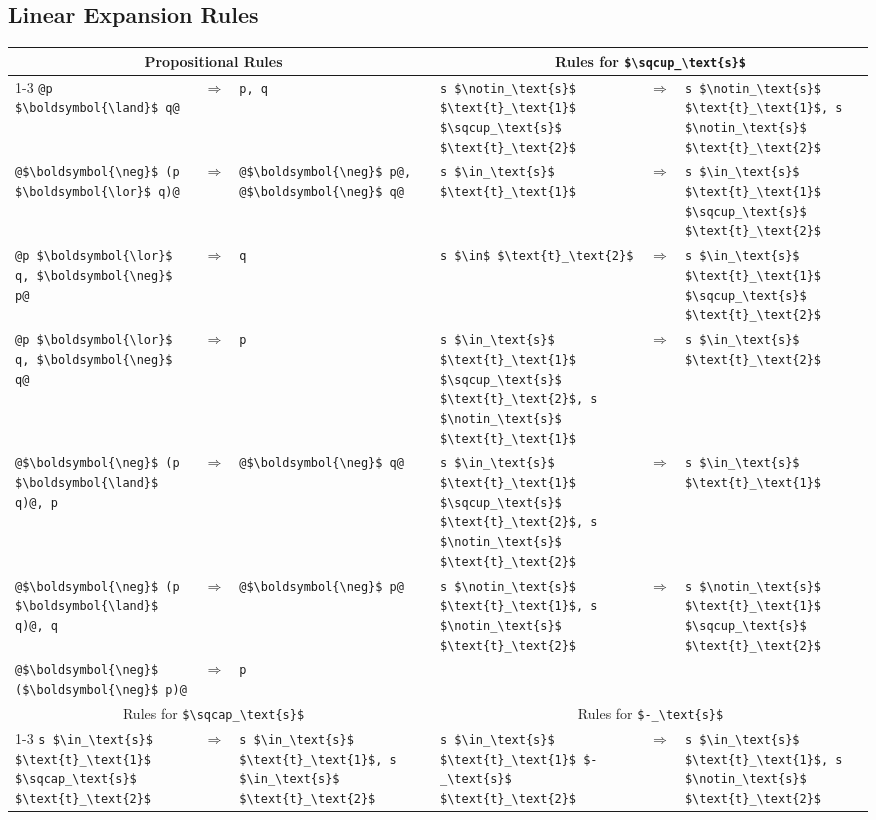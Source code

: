 \documentclass[
  sigplan,
  10pt,
  ]{acmart}
\newcommand{\unionS}{\sqcup_\text{s}}
\newcommand{\interS}{\sqcap_\text{s}}
\newcommand{\diffS}{-_\text{s}}
\newcommand{\inS}{\in_\text{s}}
\newcommand{\notinS}{\notin_\text{s}}
\newcommand{\fmAnd}[2]{#1 $\boldsymbol{\land}$ #2}
\newcommand{\fmOr}[2]{#1 $\boldsymbol{\lor}$ #2}
\newcommand{\fmNegSymbol}{\boldsymbol{\neg}}
\newcommand{\fmNeg}[1]{$\fmNegSymbol$ #1}
\begin{document}
\subsection{Linear Expansion Rules}
\begin{table}
  \newcommand{\ton}{\text{t}_\text{1}}
  \newcommand{\ttw}{\text{t}_\text{2}}
  \begin{tabular}{p{}cp{} p{} p{}cp{}}
    \toprule
    \multicolumn{3}{c}{Propositional Rules} && \multicolumn{3}{c}{Rules for \lstinline!$\unionS$!} \\
    \cmidrule{1-3}\cmidrule{5-7}
    \lstinline!@\fmAnd{p}{q}@! & $\Longrightarrow$ & \lstinline!p, q! &&
    \lstinline!s $\notinS$ $\ton$ $\unionS$ $\ttw$! & $\Longrightarrow$ & \lstinline!s $\notinS$ $\ton$, s $\notinS$ $\ttw$! \\

    \lstinline!@\fmNeg{(\fmOr{p}{q})}@! & $\Longrightarrow$ & \lstinline!@\fmNeg{p}@, @\fmNeg{q}@! &&
    \lstinline!s $\inS$ $\ton$! & $\Longrightarrow$ & \lstinline!s $\inS$ $\ton$ $\unionS$ $\ttw$! \\

    \lstinline!@\fmOr{p}{q}, \fmNeg{p}@! & $\Longrightarrow$ & \lstinline!q! &&
    \lstinline!s $\in$ $\ttw$! & $\Longrightarrow$ & \lstinline!s $\inS$ $\ton$ $\unionS$ $\ttw$! \\

    \lstinline!@\fmOr{p}{q}, \fmNeg{q}@! & $\Longrightarrow$ & \lstinline!p! &&
    \lstinline!s $\inS$ $\ton$ $\unionS$ $\ttw$, s $\notinS$ $\ton$! & $\Longrightarrow$ & \lstinline!s $\inS$ $\ttw$! \\

    \lstinline!@\fmNeg{(\fmAnd{p}{q})}@, p! & $\Longrightarrow$ & \lstinline!@\fmNeg{q}@! &&
    \lstinline!s $\inS$ $\ton$ $\unionS$ $\ttw$, s $\notinS$ $\ttw$! & $\Longrightarrow$ & \lstinline!s $\inS$ $\ton$! \\

    \lstinline!@\fmNeg{(\fmAnd{p}{q})}@, q! & $\Longrightarrow$ & \lstinline!@\fmNeg{p}@! &&
    \lstinline!s $\notinS$ $\ton$, s $\notinS$ $\ttw$! & $\Longrightarrow$ & \lstinline!s $\notinS$ $\ton$ $\unionS$ $\ttw$! \\
    \lstinline!@\fmNeg{(\fmNeg{p})}@! & $\Longrightarrow$ & \lstinline!p! &&&& \\[3ex]


    \multicolumn{3}{c}{Rules for \lstinline!$\interS$!} && \multicolumn{3}{c}{Rules for \lstinline!$\diffS$!} \\
    \cmidrule{1-3}\cmidrule{5-7}
    \lstinline!s $\inS$ $\ton$ $\interS$ $\ttw$! & $\Longrightarrow$ & \lstinline!s $\inS$ $\ton$, s $\inS$ $\ttw$! &&
    \lstinline!s $\inS$ $\ton$ $\diffS$ $\ttw$! & $\Longrightarrow$ & \lstinline!s $\inS$ $\ton$, s $\notinS$ $\ttw$! \\


\end{tabular}
\end{table}
\end{document}
